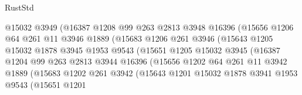 \begin{lexlean}{RustStd}
\begin{coremodule}
                              @15032
                              @3949
                              (@16387
                                @1208
                                @99
                                @263
                                @2813
                                @3948
                                @16396
                                (@15656
                                  @1206
                                  @64
                                  @261
                                  @11
                                  @3946
                                  @1889
                                  (@15683
                                    @1206
                                    @261
                                    @3946
                                    (@15643
                                      @1205
                                      @15032
                                      @1878
                                      @3945
                                      @1953
                                      @9543
                                      (@15651
                                        @1205
                                        @15032
                                        @3945
                                        (@16387
                                          @1204
                                          @99
                                          @263
                                          @2813
                                          @3944
                                          @16396
                                          (@15656
                                            @1202
                                            @64
                                            @261
                                            @11
                                            @3942
                                            @1889
                                            (@15683
                                              @1202
                                              @261
                                              @3942
                                              (@15643
                                                @1201
                                                @15032
                                                @1878
                                                @3941
                                                @1953
                                                @9543
                                                (@15651
                                                  @1201

\end{coremodule}
\end{lexlean}
